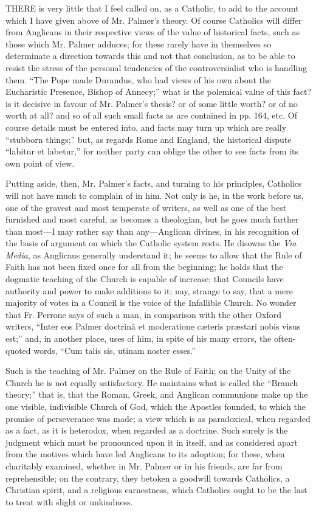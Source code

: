 
THERE
is very little that I feel called on, as a Catholic, to add to the
account which I have given above of Mr. Palmer's theory. Of course
Catholics will differ from Anglicans in their respective views of the
value of historical facts, such as those which Mr. Palmer adduces; for
these rarely have in themselves so determinate a direction towards
this and not that conclusion, as to be able to resist the stress of
the personal tendencies of the controversialist who is handling them. ``The
Pope made Durandus, who had views of his own about the Eucharistic
Presence, Bishop of Annecy;'' what is the polemical value of this fact?
is it decisive in favour of Mr. Palmer's thesis? or of some little
worth? or of no worth at all? and so of all such small facts as are
contained in pp. 164, etc. Of course details must be entered into, and
facts may turn up which are really ``stubborn things;'' but, as regards
Rome and England, the historical dispute ``labitur et labetur,'' for
neither party can oblige the other to see facts from its own point of
view.

Putting aside, then, Mr. Palmer's facts, and
turning to his principles, Catholics will not have much to complain of
in him. Not only is he, in the work before us, one of the gravest and
most temperate of writers, as well as one of the best furnished and
most careful, as becomes a theologian, but he goes much farther than
most—I may rather say than any—Anglican divines, in his
recognition of the basis of argument on which the Catholic system
rests. He disowns the \emph{Via Media},
as Anglicans generally understand it; he seems to allow
that the Rule of Faith has not been fixed once for all from the
beginning; he holds that the dogmatic teaching of the Church is
capable of increase; that Councils have authority and power to make
additions to it; nay, strange to say, that a mere majority of votes in
a Council is the voice of the Infallible Church. No wonder that Fr.
Perrone says of such a man, in comparison with the other Oxford
writers, ``Inter eos Palmer doctrinâ et moderatione cæteris præstari
nobis visus est;'' and, in another place, uses of him, in spite of his
many errors, the often-quoted words, ``Cum talis sis, utinam noster
esses.''

Such is the teaching of Mr. Palmer on the Rule of
Faith; on the Unity of the Church he is not equally satisfactory. He
maintains what is called the ``Branch theory;'' that is, that the Roman,
Greek, and Anglican communions make up the one visible, indivisible
Church of God, which the Apostles founded, to which the promise of
perseverance was made; a view which is as paradoxical, when regarded
as a fact, as it is heterodox, when regarded as a doctrine. Such
surely is the judgment which must be pronounced upon it in itself, and
as considered apart from the motives which have led Anglicans to its
adoption; for these, when charitably examined, whether in Mr. Palmer
or in his friends, are far from reprehensible; on the contrary, they
betoken a goodwill towards Catholics, a Christian spirit, and a
religious earnestness, which Catholics ought to be the last to treat
with slight or unkindness.


